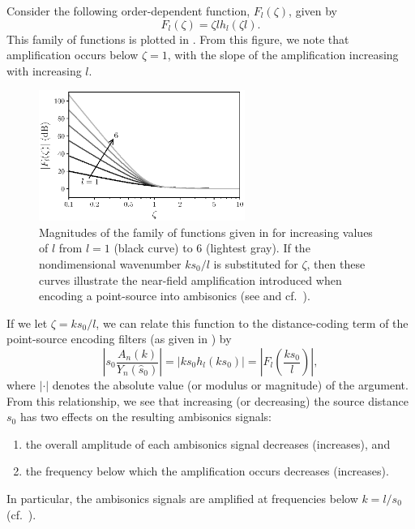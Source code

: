 Consider the following order-dependent function, $F_l(\zeta)$, given by
\begin{equation}\label{eq:02_Acoustical_Theory:Fl_zeta}
F_l(\zeta) = \zeta l h_l (\zeta l).
\end{equation}
This family of functions is plotted in .
From this figure, we note that amplification occurs below $\zeta = 1$, with the slope of the amplification increasing with increasing $l$.

\begin{figure}[t]
\centering
  \includegraphics[width = 0.6\textwidth]{02_acoustical_theory/figures/nearfield_amplification.eps}
  \caption[Magnitudes of the family of functions given in .]{
  Magnitudes of the family of functions given in  for increasing values of $l$ from $l = 1$ (black curve) to $6$ (lightest gray).
  If the nondimensional wavenumber $k s_0 / l$ is substituted for $\zeta$, then these curves illustrate the near-field amplification introduced when encoding a point-source into ambisonics (see  and cf.~\citet[Fig.~4]{Daniel2003b}).}
  \label{fig:02_Acoustical_Theory:Nearfield_Amplification}
\end{figure}

If we let $\zeta = k s_0 / l$, we can relate this function to the distance-coding term of the point-source encoding filters (as given in ) by
\begin{equation}\label{eq:02_Acoustical_Theory:Nearfield_Amplification}
\left| s_0 \frac{A_n (k)}{Y_n (\hat{s}_0)} \right| = \left| k s_0 h_l (k s_0) \right| = \left| F_l \left( \frac{k s_0}{l} \right) \right|,
\end{equation}
where $|\cdot|$ denotes the absolute value (or modulus or magnitude) of the argument.
From this relationship, we see that increasing (or decreasing) the source distance $s_0$ has two effects on the resulting ambisonics signals:
\begin{enumerate}
\item the overall amplitude of each ambisonics signal decreases (increases), and
\item the frequency below which the amplification occurs decreases (increases).
\end{enumerate}
In particular, the ambisonics signals are amplified at frequencies below $k = l / s_0$ (cf.~\citep[section 2.1]{Daniel2003b}).

